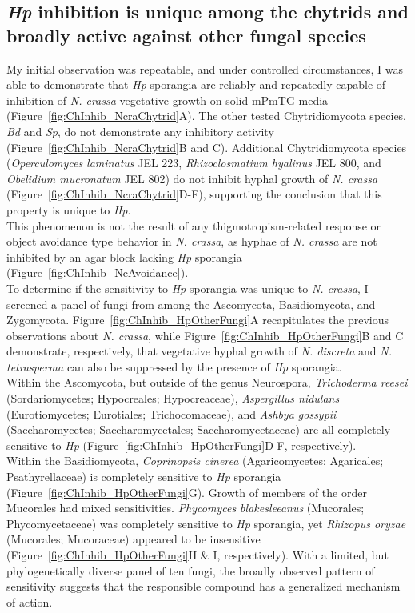 \subsection*{\textit{Hp} inhibition is unique among the chytrids and broadly active against other fungal species}
My initial observation was repeatable, and under controlled circumstances, I was able to demonstrate that \textit{Hp} sporangia are reliably and repeatedly capable of inhibition of \textit{N. crassa} vegetative growth on solid mPmTG media (Figure~\ref{fig:ChInhib_NcraChytrid}A). The other tested Chytridiomycota species, \textit{Bd} and \textit{Sp}, do not demonstrate any inhibitory activity (Figure~\ref{fig:ChInhib_NcraChytrid}B and C). Additional Chytridiomycota species (\textit{Operculomyces laminatus} JEL 223, \textit{Rhizoclosmatium hyalinus} JEL 800, and \textit{Obelidium mucronatum} JEL 802) do not inhibit hyphal growth of \textit{N. crassa} (Figure~\ref{fig:ChInhib_NcraChytrid}D-F), supporting the conclusion that this property is unique to \textit{Hp}. \\
\indent This phenomenon is not the result of any thigmotropism-related response or object avoidance type behavior in \textit{N. crassa}, as hyphae of \textit{N. crassa} are not inhibited by an agar block lacking \textit{Hp} sporangia (Figure~\ref{fig:ChInhib_NcAvoidance}).\\
\indent To determine if the sensitivity to \textit{Hp} sporangia was unique to \textit{N. crassa}, I screened a panel of fungi from among the Ascomycota, Basidiomycota, and Zygomycota. Figure~\ref{fig:ChInhib_HpOtherFungi}A recapitulates the previous observations about \textit{N. crassa}, while Figure~\ref{fig:ChInhib_HpOtherFungi}B and C demonstrate, respectively, that vegetative hyphal growth of \textit{N. discreta} and \textit{N. tetrasperma} can also be suppressed by the presence of \textit{Hp} sporangia.\\
\indent Within the Ascomycota, but outside of the genus Neurospora, \textit{Trichoderma reesei} (Sordariomycetes; Hypocreales; Hypocreaceae), \textit{Aspergillus nidulans} (Eurotiomycetes; Eurotiales; Trichocomaceae), and \textit{Ashbya gossypii} (Saccharomycetes; Saccharomycetales; Saccharomycetaceae) are all completely sensitive to \textit{Hp} (Figure~\ref{fig:ChInhib_HpOtherFungi}D-F, respectively). \\
\indent Within the Basidiomycota, \textit{Coprinopsis cinerea} (Agaricomycetes; Agaricales; Psathyrellaceae) is completely sensitive to \textit{Hp} sporangia (Figure~\ref{fig:ChInhib_HpOtherFungi}G). Growth of members of the order Mucorales had mixed sensitivities. \textit{Phycomyces blakesleeanus} (Mucorales; Phycomycetaceae) was completely sensitive to \textit{Hp} sporangia, yet \textit{Rhizopus oryzae} (Mucorales; Mucoraceae) appeared to be insensitive (Figure~\ref{fig:ChInhib_HpOtherFungi}H \& I, respectively). With a limited, but phylogenetically diverse panel of ten fungi, the broadly observed pattern of sensitivity suggests that the responsible compound has a generalized mechanism of action.\\
